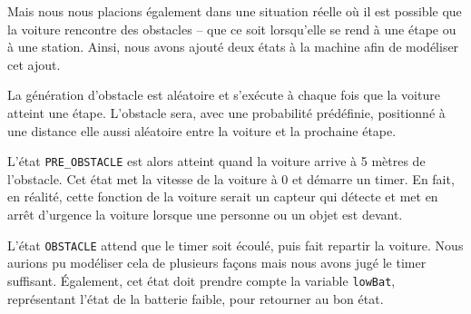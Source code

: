 \documentclass[conference]{IEEEtran}
\begin{document}
Mais nous nous placions également dans une situation réelle où il est possible que la
voiture rencontre des obstacles -- que ce soit lorsqu'elle se rend à une étape ou à une
station. Ainsi, nous avons ajouté deux états à la machine afin de modéliser cet ajout.

La génération d'obstacle est aléatoire et s'exécute à chaque fois que la voiture atteint
une étape. L'obstacle sera, avec une probabilité prédéfinie, positionné à une distance
elle aussi aléatoire entre la voiture et la prochaine étape.

L'état \texttt{PRE\_OBSTACLE} est alors atteint quand la voiture arrive à 5 mètres de
l'obstacle. Cet état met la vitesse de la voiture à 0 et démarre un timer. En fait, en
réalité, cette fonction de la voiture serait un capteur qui détecte et met en arrêt
d'urgence la voiture lorsque une personne ou un objet est devant.

L'état \texttt{OBSTACLE} attend que le timer soit écoulé, puis fait repartir la voiture.
Nous aurions pu modéliser cela de plusieurs façons mais nous avons jugé le timer
suffisant. Également, cet état doit prendre compte la variable \texttt{lowBat},
représentant l'état de la batterie faible, pour retourner au bon état.
\end{document}
